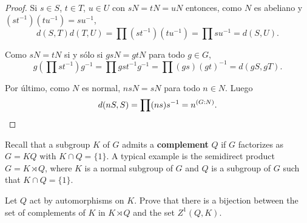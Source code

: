 \begin{proof}
	Si $s\in S$, $t\in T$, $u\in U$ con $sN=tN=uN$ entonces, como $N$ es
	abeliano y $(st^{-1})(tu^{-1})=su^{-1}$, 
	\[
		d(S,T)d(T,U)=\prod (st^{-1})(tu^{-1})=\prod su^{-1}=d(S,U).
	\]

	Como $sN=tN$ si y sólo si $gsN=gtN$ para todo $g\in G$, 
	\[
	g\left(\prod st^{-1}\right)g^{-1}=\prod gst^{-1}g^{-1}=\prod (gs)(gt)^{-1}=d(gS,gT).
	\]

	Por último, como $N$ es normal, $nsN=sN$ para todo $n\in N$. Luego
	\[
		d(nS,S)=\prod (ns)s^{-1}=n^{(G:N)}.\qedhere
	\]
\end{proof}

Recall that a subgroup $K$ of $G$ admits a \textbf{complement} $Q$ 
if $G$ factorizes as 
$G=KQ$ with $K\cap Q=\{1\}$. 
A typical example is the semidirect product $G=K\rtimes Q$, where $K$ is a normal subgroup of 
$G$ and $Q$ is a subgroup of $G$ such that $K\cap Q=\{1\}$. 

\begin{exercise}
\label{xca:complementos}
Let $Q$ act by automorphisms on $K$. Prove that there is a bijection 
between the set of complements of $K$ in $K\rtimes Q$ and the set 
$Z^1(Q,K)$.
\end{exercise}

	
	


